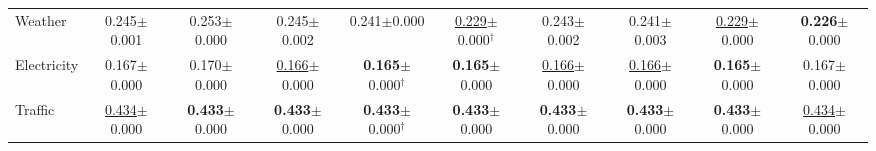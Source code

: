 \begin{table}[t]
{\begin{tabular}{l|ccccccccc}
Weather & 0.245{\scriptsize$\pm$0.001} & 0.253{\scriptsize$\pm$0.000} & 0.245{\scriptsize$\pm$0.002} & 0.241{\scriptsize$\pm$0.000} & \underline{0.229}{\scriptsize$\pm$0.000}$^\dagger$ & 0.243{\scriptsize$\pm$0.002} & 0.241{\scriptsize$\pm$0.003} & \underline{0.229}{\scriptsize$\pm$0.000} & \textbf{0.226}{\scriptsize$\pm$0.000} \\
Electricity & 0.167{\scriptsize$\pm$0.000} & 0.170{\scriptsize$\pm$0.000} & \underline{0.166}{\scriptsize$\pm$0.000} & \textbf{0.165}{\scriptsize$\pm$0.000}$^\dagger$ & \textbf{0.165}{\scriptsize$\pm$0.000} & \underline{0.166}{\scriptsize$\pm$0.000} & \underline{0.166}{\scriptsize$\pm$0.000} & \textbf{0.165}{\scriptsize$\pm$0.000} & 0.167{\scriptsize$\pm$0.000} \\
Traffic & \underline{0.434}{\scriptsize$\pm$0.000} & \textbf{0.433}{\scriptsize$\pm$0.000} & \textbf{0.433}{\scriptsize$\pm$0.000} & \textbf{0.433}{\scriptsize$\pm$0.000}$^\dagger$ & \textbf{0.433}{\scriptsize$\pm$0.000} & \textbf{0.433}{\scriptsize$\pm$0.000} & \textbf{0.433}{\scriptsize$\pm$0.000} & \textbf{0.433}{\scriptsize$\pm$0.000} & \underline{0.434}{\scriptsize$\pm$0.000} \\
\bottomrule
\end{tabular}
}
\end{table}
